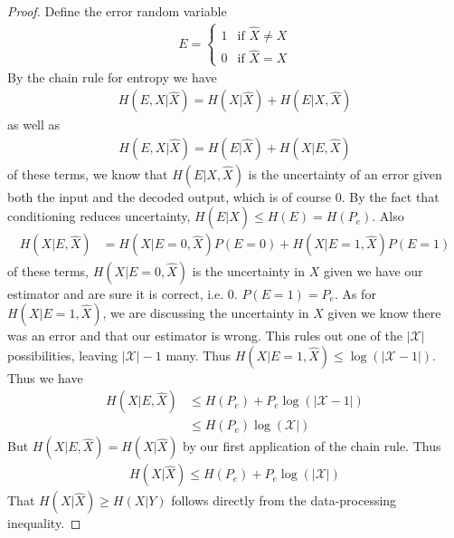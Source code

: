 \begin{proof}
	Define the error random variable
	\begin{align}
		E = \begin{cases} 1 & \textrm{if }\hat{X} \neq X \\ 0 & \textrm{if }\hat{X}=X \end{cases}
	\end{align}
	By the chain rule for entropy we have
	\begin{align}
		H(E,X|\hat{X}) = H(X|\hat{X}) + H(E|X,\hat{X})
	\end{align}
	as well as 
	\begin{align}
		H(E,X|\hat{X}) = H(E|\hat{X}) + H(X|E,\hat{X})
	\end{align}
	of these terms, we know that $H(E|X,\hat{X})$ is the uncertainty of an error given both the input and the decoded output, which is of course $0$. By the fact that conditioning reduces uncertainty, $H(E|\hat{X}) \leq H(E) = H(P_e)$. Also 
	\begin{align}
		H(X|E,\hat{X}) &= H(X|E=0,\hat{X})P(E=0) + H(X|E=1,\hat{X})P(E=1) 
	\end{align}
	of these terms, $H(X|E=0,\hat{X})$ is the uncertainty in $X$ given we have our estimator and are sure it is correct, i.e. $0$. $P(E=1) = P_e$. As for $H(X|E=1,\hat{X})$, we are discussing the uncertainty in $X$ given we know there was an error and that our estimator is wrong. This rules out one of the $|\mathcal{X}|$ possibilities, leaving $|\mathcal{X}|-1$ many. Thus $H(X|E=1,\hat{X}) \leq \log(|\mathcal{X}-1|)$. Thus we have
	\begin{align}
		H(X|E,\hat{X}) &\leq H(P_e) + P_e\log(|\mathcal{X}-1|) \\ &\leq H(P_e)\log(\mathcal{X}|) 
	\end{align} 
	But $H(X|E,\hat{X}) = H(X|\hat{X})$ by our first application of the chain rule. Thus
	\begin{align}
		H(X|\hat{X}) \leq H(P_e) + P_e\log(|\mathcal{X}|)
	\end{align}
	That $H(X|\hat{X}) \geq H(X|Y)$ follows directly from the data-processing inequality. 
\end{proof}

